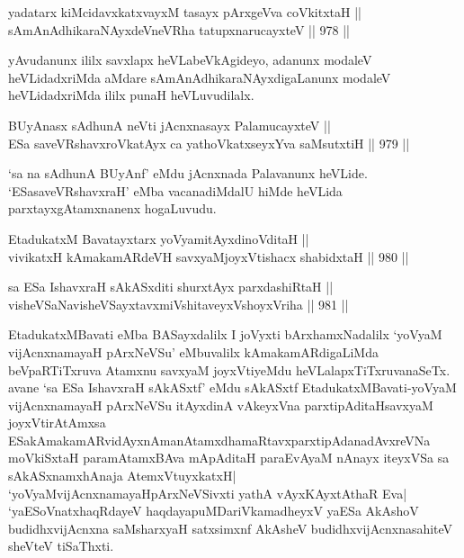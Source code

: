\begin{shl}
yadatarx kiMcidavxkatxvayxM tasayx pArxgeVva coVkitxtaH || \\
\footnotemark[4]sAmAnAdhikaraNAyxdeVneVRha tatupxnarucayxteV \hfill || 978 ||  
\end{shl}

\begin{artha}
yAvudanunx ililx savxlapx heVLabeVkAgideyo, adanunx modaleV heVLidadxriMda aMdare sAmAnAdhikaraNAyxdigaLanunx modaleV heVLidadxriMda ililx punaH heVLuvudilalx.
\end{artha}


\begin{shl}
BUyAnasx sAdhunA neVti jAcnxnasayx PalamucayxteV || \\
ESa saveVRshavxroVkatAyx ca yathoVkatxseyxYva saMsutxtiH \hfill || 979 ||  
\end{shl}

\begin{artha}
`sa na sAdhunA BUyAnf' eMdu jAcnxnada Palavanunx heVLide. `ESasaveVRshavxraH' eMba vacanadiMdalU hiMde heVLida parxtayxgAtamxnanenx hogaLuvudu.
\end{artha}


\begin{shl}
EtadukatxM Bavatayxtarx yoV\s yamitAyxdinoVditaH || \\
vivikatxH kAmakamARdeVH savxyaMjoyxVtishacx shabidxtaH \hfill || 980 ||  
\end{shl}
				
\begin{shl}
sa ESa IshavxraH sAkASxditi shurxtAyx parxdashiRtaH || \\
visheVSaNavisheVSayxtavxmiVshitaveyxVshoyxVriha \hfill || 981 ||  
\end{shl}

\begin{artha}
EtadukatxMBavati eMba BASayxdalilx I joVyxti bArxhamxNadalilx `yoV\s yaM vijAcnxnamayaH pArxNeVSu' eMbuvalilx kAmakamARdigaLiMda beVpaRTiTxruva Atamxnu savxyaM joyxVtiyeMdu heVLalapxTiTxruvanaSeTx. avane `sa ESa IshavxraH sAkASxtf' eMdu sAkASxtf EtadukatxMBavati-yoV\s yaM vijAcnxnamayaH pArxNeVSu itAyxdinA vAkeyxVna parxtipAditaHsavxyaM joyxVtirAtAmxsa ESakAmakamARvidAyxnAmanAtamxdhamaRtavxparxtipAdanadAvxreVNa moVkiSxtaH paramAtamxBAva mApAditaH paraEvAyaM nAnayx iteyxVSa sa sAkASxnamxhAnaja AtemxVtuyxkatxH| `yoV\s yaMvijAcnxnamayaHpArxNeVSivxti yathA vAyxKAyxtAthaR Eva| `yaESoV\s natxhaqRdayeV haqdayapuMDariVkamadheyxV yaESa AkAshoV budidhxvijAcnxna saMsharxyaH satxsimxnf AkAsheV budidhxvijAcnxnasahiteV sheVteV tiSaThxti.
\end{artha}

